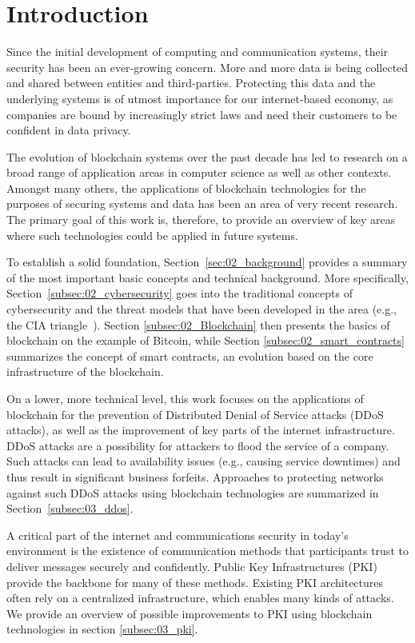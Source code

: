 \section{Introduction}

Since the initial development of computing and communication systems, their security has been an ever-growing concern. More and more data is being collected and shared between entities and third-parties. Protecting this data and the underlying systems is of utmost importance for our internet-based economy, as companies are bound by increasingly strict laws and need their customers to be confident in data privacy.

The evolution of blockchain systems over the past decade has led to research on a broad range of application areas in computer science as well as other contexts. Amongst many others, the applications of blockchain technologies for the purposes of securing systems and data has been an area of very recent research. The primary goal of this work is, therefore, to provide an overview of key areas where such technologies could be applied in future systems.

To establish a solid foundation, Section~\ref{sec:02_background} provides a summary of the most important basic concepts and technical background. More specifically, Section~\ref{subsec:02_cybersecurity} goes into the traditional concepts of cybersecurity and the threat models that have been developed in the area (e.g., the CIA triangle~\cite{whitman2011principles}). Section \ref{subsec:02_Blockchain} then presents the basics of blockchain on the example of Bitcoin, while Section \ref{subsec:02_smart_contracts} summarizes the concept of smart contracts, an evolution based on the core infrastructure of the blockchain.

On a lower, more technical level, this work focuses on the applications of blockchain for the prevention of Distributed Denial of Service attacks (DDoS attacks), as well as the improvement of key parts of the internet infrastructure. DDoS attacks are a possibility for attackers to flood the service of a company. Such attacks can lead to availability issues (e.g., causing service downtimes) and thus result in significant business forfeits. Approaches to protecting networks against such DDoS attacks using blockchain technologies are summarized in Section~\ref{subsec:03_ddos}.

A critical part of the internet and communications security in today's environment is the existence of communication methods that participants trust to deliver messages securely and confidently. Public Key Infrastructures (PKI) provide the backbone for many of these methods. Existing PKI architectures often rely on a centralized infrastructure, which enables many kinds of attacks. We provide an overview of possible improvements to PKI using blockchain technologies in section \ref{subsec:03_pki}.

